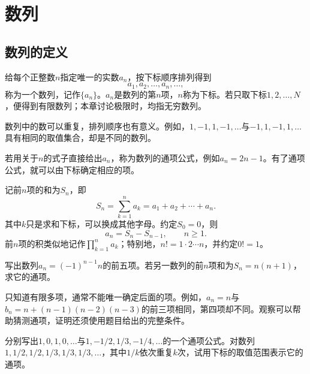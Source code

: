 \section{数列}
\label{sec:analysis-sequence-basics}

\subsection{数列的定义}

\begin{definition}
给每个正整数\(n\)指定唯一的实数\(a_n\)，按下标顺序排列得到
\begin{equation*}
 a_1,a_2,\ldots,a_n,\ldots,
\end{equation*}
称为一个{\heiti{}数列}，记作\(\{a_n\}\)。\(a_n\)是数列的第\(n\)项，\(n\)称为下标。若只取下标\(1,2,\ldots,N\)，便得到有限数列；本章讨论极限时，均指无穷数列。
\end{definition}

数列中的数可以重复，排列顺序也有意义。例如，\(1,-1,1,-1,\ldots\)与\(-1,1,-1,1,\ldots\)具有相同的取值集合，却是不同的数列。

若用关于\(n\)的式子直接给出\(a_n\)，称为数列的{\heiti{}通项公式}，例如\(a_n=2n-1\)。有了通项公式，就可以由下标确定相应的项。

记前\(n\)项的和为\(S_n\)，即
\begin{equation}\label{eq:analysis-partial-sum-definition}
 S_n=\sum_{k=1}^{n}a_k=a_1+a_2+\cdots+a_n.
\end{equation}
其中\(k\)只是求和下标，可以换成其他字母。约定\(S_0=0\)，则
\begin{equation}\label{eq:analysis-term-from-sum}
 a_n=S_n-S_{n-1},\qquad n\ge1.
\end{equation}
前\(n\)项的积类似地记作\(\prod_{k=1}^{n}a_k\)；特别地，\(n!=1\cdot2\cdots n\)，并约定\(0!=1\)。

\begin{example}
写出数列\(a_n=(-1)^{n-1}n\)的前五项。若另一数列的前\(n\)项和为\(S_n=n(n+1)\)，求它的通项。
\end{example}

只知道有限多项，通常不能唯一确定后面的项。例如，\(a_n=n\)与\(b_n=n+(n-1)(n-2)(n-3)\)的前三项相同，第四项却不同。观察可以帮助猜测通项，证明还须使用题目给出的完整条件。

\begin{example}
分别写出\(1,0,1,0,\ldots\)与\(1,-1/2,1/3,-1/4,\ldots\)的一个通项公式。对数列\(1,1/2,1/2,1/3,1/3,1/3,\ldots\)，其中\(1/k\)依次重复\(k\)次，试用下标的取值范围表示它的通项。
\end{example}

